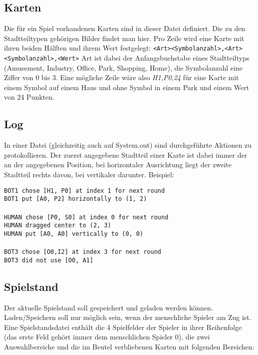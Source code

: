 \subsection{Karten}
Die für ein Spiel vorhandenen Karten sind in dieser Datei definiert. Die zu den Stadtteiltypen gehörigen Bilder findet man hier.
Pro Zeile wird eine Karte mit ihren beiden Hälften und ihrem Wert festgelegt:
\verb|<Art><Symbolanzahl>,<Art><Symbolanzahl>,<Wert>|
Art ist dabei der Anfangsbuchstabe eines Stadtteiltyps (Amusement, Industry, Office, Park, Shopping, Home), die Symbolanzahl eine Ziffer von 0 bis 3. Eine mögliche Zeile wäre also \emph{H1,P0,24}
für eine Karte mit einem Symbol auf einem Haus und ohne Symbol in einem Park und einem Wert von 24 Punkten.

\subsection{Log}
In einer Datei (gleichzeitig auch auf System.out) sind durchgeführte Aktionen zu protokollieren. Der zuerst angegebene Stadtteil einer Karte ist dabei immer der an der angegebenen Position, bei horizontaler Ausrichtung liegt der zweite Stadtteil rechts davon, bei vertikaler darunter. Beispiel: \newline
\begin{addmargin}[50pt]{0pt}
 \verb|BOT1 chose [H1, P0] at index 1 for next round|
\\ \verb|BOT1 put [A0, P2] horizontally to (1, 2)|\\
\\ \verb|HUMAN chose [P0, S0] at index 0 for next round|
\\ \verb|HUMAN dragged center to (2, 3)|
\\ \verb|HUMAN put [A0, A0] vertically to (0, 0)|\\
\\ \verb|BOT3 chose [O0,I2] at index 3 for next round|
\\ \verb|BOT3 did not use [O0, A1]|
\end{addmargin}

\subsection{Spielstand}
Der aktuelle Spielstand soll gespeichert und geladen werden können. Laden/Speichern soll nur möglich sein, wenn der menschliche Spieler am Zug ist. Eine Spielstandsdatei enthält die 4 Spielfelder der Spieler in ihrer Reihenfolge (das erste Feld gehört immer dem menschlichen Spieler 0), die zwei Auswahlbereiche und die im Beutel verbliebenen Karten mit folgenden Bereichen:\\

